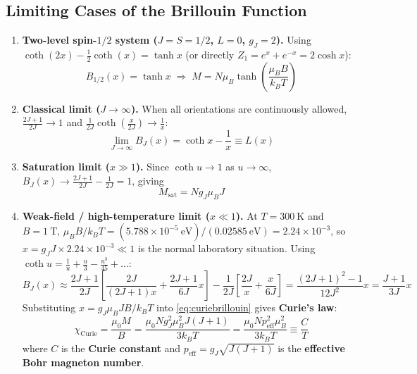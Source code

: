 \documentclass[11pt,a4paper]{article}
\begin{document}
\subsection{Limiting Cases of the Brillouin Function}

\begin{enumerate}[leftmargin=1.6cm]
    \item \textbf{Two-level spin-$1/2$ system ($J = S = 1/2$, $L = 0$, $g_J = 2$).}
    Using $\coth(2x) - \frac{1}{2}\coth(x) = \tanh x$ (or directly $Z_1 = e^x+e^{-x} = 2\cosh x$):
    \begin{equation}
        B_{1/2}(x) = \tanh x
        \;\Longrightarrow\;
        M = N\mu_B\tanh\!\left(\frac{\mu_BB}{k_BT}\right)
        \label{eq:tanhhalf}
    \end{equation}
    \item \textbf{Classical limit ($J\to\infty$).}
    When all orientations are continuously allowed, $\frac{2J+1}{2J}\to 1$ and $\frac{1}{2J}\coth\!\left(\frac{x}{2J}\right)\to\frac{1}{x}$:
    \begin{equation}
        \lim_{J\to\infty}B_J(x) = \coth x - \frac{1}{x} \equiv L(x)
        \label{eq:langevin}
    \end{equation}
    \item \textbf{Saturation limit ($x\gg 1$).}
    Since $\coth u\to 1$ as $u\to\infty$, $B_J(x)\to \frac{2J+1}{2J}-\frac{1}{2J} = 1$, giving
    \begin{equation}
        M_{\mathrm{sat}} = Ng_J\mu_BJ
        \label{eq:Msat}
    \end{equation}
    \item \textbf{Weak-field / high-temperature limit ($x\ll 1$).}
    At $T = 300\ \mathrm{K}$ and $B = 1\ \mathrm{T}$, $\mu_BB/k_BT = (5.788\times10^{-5}\ \mathrm{eV})/(0.02585\ \mathrm{eV}) = 2.24\times10^{-3}$, so $x = g_JJ\times2.24\times10^{-3}\ll1$ is the normal laboratory situation. Using $\coth u = \frac{1}{u}+\frac{u}{3}-\frac{u^3}{45}+\dots$:
    \begin{equation}
        B_J(x) \approx \frac{2J+1}{2J}\left[\frac{2J}{(2J+1)x} + \frac{2J+1}{6J}x\right]
        - \frac{1}{2J}\left[\frac{2J}{x}+\frac{x}{6J}\right]
        = \frac{(2J+1)^2-1}{12J^2}x
        = \frac{J+1}{3J}x
        \label{eq:bjexpansion}
    \end{equation}
    Substituting $x = g_J\mu_BJB/k_BT$ into \eqref{eq:curiebrillouin} gives \textbf{Curie's law}:
    \begin{equation}
        \boxed{\;\chi_{\mathrm{Curie}} = \frac{\mu_0M}{B}
        = \frac{\mu_0Ng_J^2\mu_B^2J(J+1)}{3k_BT}
        = \frac{\mu_0Np_{\mathrm{eff}}^2\mu_B^2}{3k_BT}
        \equiv \frac{C}{T}\;}
        \label{eq:curielaw}
    \end{equation}
    where $C$ is the \textbf{Curie constant} and $p_{\mathrm{eff}} = g_J\sqrt{J(J+1)}$ is the \textbf{effective Bohr magneton number}.
\end{enumerate}
\end{document}
